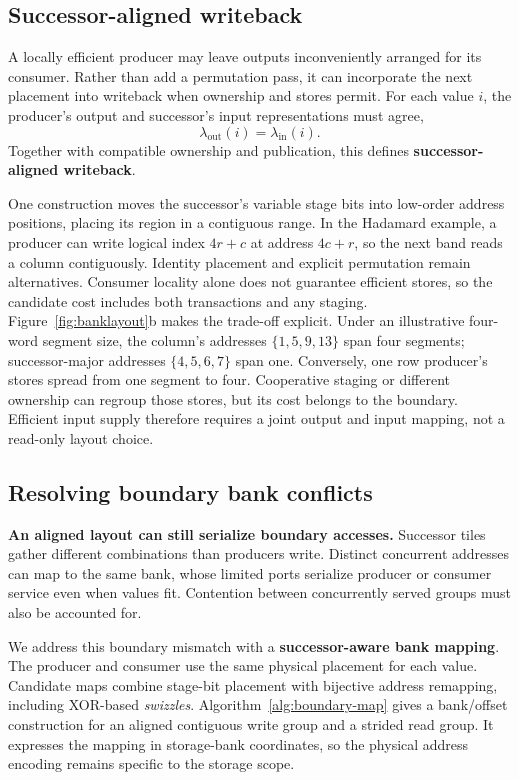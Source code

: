 \subsection{Successor-aligned writeback}
A locally efficient producer may leave outputs inconveniently arranged for its
consumer. Rather than add a permutation pass, it can incorporate the next
placement into writeback when ownership and stores permit. For each value $i$,
the producer's output and successor's input representations must agree,
\begin{equation}
\lambda_{\mathrm{out}}(i)=\lambda_{\mathrm{in}}(i).
\label{eq:handoff}
\end{equation}
Together with compatible ownership and publication, this defines
\textbf{successor-aligned writeback}.

One construction moves the successor's variable stage bits into low-order
address positions, placing its region in a contiguous range. In the
Hadamard example, a producer can write logical index $4r+c$ at address
$4c+r$, so the next band reads a column contiguously. Identity placement and
explicit permutation remain alternatives. Consumer locality alone does not
guarantee efficient stores, so the candidate cost includes both transactions
and any staging. Figure~\ref{fig:banklayout}b makes the trade-off explicit.
Under an illustrative four-word segment size, the column's addresses
$\{1,5,9,13\}$ span four segments; successor-major addresses $\{4,5,6,7\}$
span one. Conversely, one row producer's stores spread from one segment to
four. Cooperative staging or different ownership can regroup those stores,
but its cost belongs to the boundary. Efficient input supply therefore
requires a joint output and input mapping, not a read-only layout choice.

\subsection{Resolving boundary bank conflicts}
\label{sec:boundary-conflicts}
\textbf{An aligned layout can still serialize boundary accesses.}
Successor tiles gather different combinations than producers write.
Distinct concurrent addresses can map to the same bank, whose limited ports
serialize producer or consumer service even when values fit. Contention
between concurrently served groups must also be accounted for.

We address this boundary mismatch with a \textbf{successor-aware bank mapping}.
The producer and consumer use the same physical placement for each value.
Candidate maps combine stage-bit placement with bijective address remapping,
including XOR-based \emph{swizzles}. Algorithm~\ref{alg:boundary-map}
gives a bank/offset construction for an aligned contiguous write group and a
strided read group. It expresses the mapping in storage-bank coordinates,
so the physical address encoding remains specific to the storage scope.

